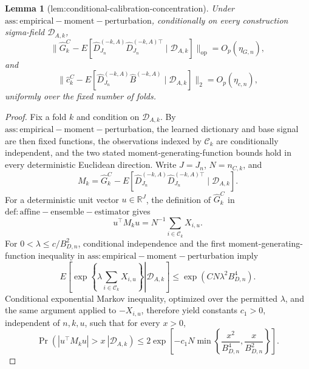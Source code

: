 \documentclass{article}
\newtheorem{lemma}{Lemma}
\begin{document}
\begin{lemma}[lem:conditional-calibration-concentration]\label{lem:conditional-calibration-concentration}
Under \(\mathrm{ass:empirical-moment-perturbation}\), conditionally on every construction sigma-field \(\mathcal D_{A,k}\),
\[
 \|\widehat G_k^C-E[\widehat D_{J_n}^{(-k,A)}\widehat D_{J_n}^{(-k,A)\top}\mid\mathcal D_{A,k}]\|_{\mathrm{op}}=O_p(\eta_{G,n}),
\]
and
\[
 \|\widehat c_k^C-E[\widehat D_{J_n}^{(-k,A)}\widehat B^{(-k,A)}\mid\mathcal D_{A,k}]\|_2=O_p(\eta_{c,n}),
\]
uniformly over the fixed number of folds.
\end{lemma}
\begin{proof}
Fix a fold \(k\) and condition on \(\mathcal D_{A,k}\).  By \(\mathrm{ass:empirical-moment-perturbation}\), the learned dictionary and base signal are then fixed functions, the observations indexed by \(\mathcal C_k\) are conditionally independent, and the two stated moment-generating-function bounds hold in every deterministic Euclidean direction.  Write \(J=J_n\), \(N=n_{C,k}\), and
\[
 M_k=\widehat G_k^C-E[\widehat D_{J_n}^{(-k,A)}
 \widehat D_{J_n}^{(-k,A)\top}\mid\mathcal D_{A,k}].
\]
For a deterministic unit vector \(u\in\mathbb R^J\), the definition of \(\widehat G_k^C\) in \(\mathrm{def:affine-ensemble-estimator}\) gives
\[
 u^\top M_ku=N^{-1}\sum_{i\in\mathcal C_k}X_{i,u}.
\]
For \(0<\lambda\le c/B_{D,n}^2\), conditional independence and the first moment-generating-function inequality in \(\mathrm{ass:empirical-moment-perturbation}\) imply
\[
 E\!\left[\left.\exp\!\left\{\lambda\sum_{i\in\mathcal C_k}X_{i,u}\right\}\right|\mathcal D_{A,k}\right]
 \le \exp(CN\lambda^2B_{D,n}^4).
\]
Conditional exponential Markov inequality, optimized over the permitted \(\lambda\), and the same argument applied to \(-X_{i,u}\), therefore yield constants \(c_1>0\), independent of \(n,k,u\), such that for every \(x>0\),
\[
 \Pr\!\left(\left.|u^\top M_ku|>x\ \right|\mathcal D_{A,k}\right)
 \le 2\exp\!\left[-c_1N\min\!\left\{
 \frac{x^2}{B_{D,n}^4},\frac{x}{B_{D,n}^2}\right\}\right]. \tag{1}
\]


\end{proof}
\end{document}
